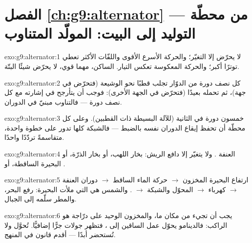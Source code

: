 \section*{الفصل \ref{ch:g9:alternator} --- من محطّة التوليد إلى البيت: المولّد المتناوب}

\begin{solution}{exo:g9:alternator:1}
لا يحرّض إلا التغيّر؛ والحركة الأسرع  الأقوى واللفّات
الأكثر تعطي توترًا أكبر؛ والحركة المعكوسة تعكس التيار.
 الساكن، مهما قوي، لا يحرّض شيئًا البتّة.
\end{solution}

\begin{solution}{exo:g9:alternator:2}
كل نصف دورة من الدوّار تجلب قطبًا نحو الوشيعة (فتحرّض في جهة)،
ثم تحمله بعيدًا (فتحرّض في الجهة الأخرى): فوجب أن يتأرجح
 في إشارته مع كل نصف دورة --- فالتناوب مبنيّ في
الدوران.
\end{solution}

\begin{solution}{exo:g9:alternator:3}
خمسون دورة في الثانية (للآلة البسيطة ذات القطبين). وعلى كل
محطّة أن تحفظ إيقاع الدوران نفسه بالضبط --- فالشبكة كلها تدور
على خطوة واحدة، متقاسمةً تردّدًا واحدًا.
\end{solution}

\begin{solution}{exo:g9:alternator:4}
العنفة . ولا يتغيّر إلا دافع الريش: بخار
اللهب، أو بخار الذرّة، أو البحيرة الساقطة، أو .
\end{solution}

\begin{solution}{exo:g9:alternator:5}
ارتفاع البحيرة المخزون $\to$ حركة الماء الساقط $\to$ دوران
العنفة $\to$ كهرباء  $\to$ المحوّل والشبكة
$\to$ . والشمس هي التي ملأت البحيرة:  رفع
البحر، والمطر سلّمه إلى الجبال.
\end{solution}

\begin{solution}{exo:g9:alternator:6}
  يجب أن تجيء من مكان ما، والمخزون الوحيد على
درّاجة هو الراكب: فالدينامو يحوّل عمل الساقين إلى ، فتظهر
جولات  جرًّا إضافيًّا.  تُحوَّل ولا تُستحضر أبدًا
--- أقدم قانون في المنهج.
\end{solution}

